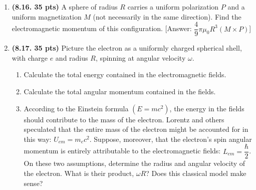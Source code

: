 \documentclass[fleqn]{article}
\begin{document}
\begin{enumerate}


    \item \textbf{(8.16. 35 pts)} A sphere of radius $R$ carries a uniform polarization $P$ and a uniform
    magnetization $M$ (not necessarily in the same direction). Find the electromagnetic momentum of this configuration.
    [Answer: $\dfrac{4}{9} \pi \mu_0 R^3 (M \times P)$]
    


    \item \textbf{(8.17. 35 pts)} Picture the electron as a uniformly charged spherical shell, with
    charge $e$ and radius $R$, spinning at angular velocity $\omega$.
    \begin{enumerate}
      \item Calculate the total energy contained in the electromagnetic fields.


      \item Calculate the total angular momentum contained in the fields.


      \item According to the Einstein formula $(E = mc^2)$, the energy in the fields should
      contribute to the mass of the electron. Lorentz and others speculated that the
      entire mass of the electron might be accounted for in this way: $U_{em} = m_e c^2$.
      Suppose, moreover, that the electron’s spin angular momentum is entirely
      attributable to the electromagnetic fields: $L_{em}=\dfrac{\hbar}{2}$. On these two 
      assumptions, determine the radius and angular velocity of the electron. What is their
      product, $\omega R$? Does this classical model make sense?
      
    \end{enumerate}


  \end{enumerate}
\end{document}

